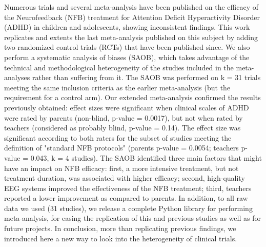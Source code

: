 

\noindent Numerous trials and several meta-analysis have been published on the efficacy of 
the Neurofeedback (NFB) treatment for Attention Deficit Hyperactivity Disorder (ADHD) in children 
and adolescents, showing inconsistent findings. This work replicates and extents the last meta-analysis 
published on this subject \citep{Cortese2016} by adding two randomized control trials (RCTs) that have been published since.
We also perform a systematic analysis of biases (SAOB), which takes advantage
of the technical and methodological heterogeneity of the studies included in the meta-analyses
rather than suffering from it.
The SAOB was performed on k = 31 trials meeting the same inclusion criteria as the earlier meta-analysis 
(but the requirement for a control arm). Our extended meta-analysis confirmed the results previously obtained: effect
sizes were significant when clinical scales of ADHD were rated by parents (non-blind, p-value = 0.0017), but not when rated by 
teachers (considered as probably blind, p-value = 0.14). The effect size was significant according to both raters for 
the subset of studies meeting the definition of "standard NFB protocols" (parents p-value = 0.0054; teachers p-value = 0.043, 
k = 4 studies). The SAOB identified three main factors that might have an impact on NFB efficacy: first, a more intensive treatment, but
not treatment duration, was associated with higher efficacy; second, high-quality EEG systems improved the effectiveness of the NFB 
treatment; third, teachers reported a lower improvement as compared to parents. In addition, to all raw data we used (31 studies), 
we release a complete Python library for performing meta-analysis, for easing the replication of this and previous studies as well 
as for future projects. In conclusion, more than replicating previous findings, we introduced here a new way to look into the 
heterogeneity of clinical trials.

